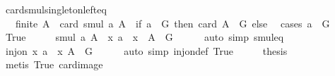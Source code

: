 \begin{isabellebody}
\endisatagproof
{\isafoldproof}%
%
\isadelimproof
\isanewline
%
\endisadelimproof
\isanewline
{}\isamarkupfalse%
\ card{\isacharunderscore}{\kern0pt}smul{\isacharunderscore}{\kern0pt}singleton{\isacharunderscore}{\kern0pt}left{\isacharunderscore}{\kern0pt}eq{\isacharcolon}{\kern0pt}\isanewline
\ \ \ {\isachardoublequoteopen}finite\ A{\isachardoublequoteclose}\ \ {\isachardoublequoteopen}card\ {\isacharparenleft}{\kern0pt}smul\ {\isacharbraceleft}{\kern0pt}a{\isacharbraceright}{\kern0pt}\ A{\isacharparenright}{\kern0pt}\ {\isacharequal}{\kern0pt}\ {\isacharparenleft}{\kern0pt}if\ a\ {\isasymin}\ G\ then\ card\ {\isacharparenleft}{\kern0pt}A\ {\isasyminter}\ G{\isacharparenright}{\kern0pt}\ else\ {}{\isacharparenright}{\kern0pt}{\isachardoublequoteclose}\isanewline
%
\isadelimproof
%
\endisadelimproof
%
\isatagproof
{}\isamarkupfalse%
\ {\isacharparenleft}{\kern0pt}cases\ {\isachardoublequoteopen}a\ {\isasymin}\ G{\isachardoublequoteclose}{\isacharparenright}{\kern0pt}\isanewline
\ \ \isamarkupfalse%
\ True\isanewline
\ \ \isamarkupfalse%
\ \isamarkupfalse%
\ {\isachardoublequoteopen}smul\ {\isacharbraceleft}{\kern0pt}a{\isacharbraceright}{\kern0pt}\ A\ {\isacharequal}{\kern0pt}\ {\isacharparenleft}{\kern0pt}{\isasymlambda}x{\isachardot}{\kern0pt}\ a\ {\isasymcdot}\ x{\isacharparenright}{\kern0pt}\ {\isacharbackquote}{\kern0pt}\ {\isacharparenleft}{\kern0pt}A\ {\isasyminter}\ G{\isacharparenright}{\kern0pt}{\isachardoublequoteclose}\isanewline
\ \ \ \ \isamarkupfalse%
\ {\isacharparenleft}{\kern0pt}auto\ simp{\isacharcolon}{\kern0pt}\ smul{\isacharunderscore}{\kern0pt}eq{\isacharparenright}{\kern0pt}\isanewline
\ \ \isamarkupfalse%
\ \isamarkupfalse%
\ {\isachardoublequoteopen}inj{\isacharunderscore}{\kern0pt}on\ {\isacharparenleft}{\kern0pt}{\isasymlambda}x{\isachardot}{\kern0pt}\ a\ {\isasymcdot}\ x{\isacharparenright}{\kern0pt}\ {\isacharparenleft}{\kern0pt}A\ {\isasyminter}\ G{\isacharparenright}{\kern0pt}{\isachardoublequoteclose}\isanewline
\ \ \ \ \isamarkupfalse%
\ {\isacharparenleft}{\kern0pt}auto\ simp{\isacharcolon}{\kern0pt}\ inj{\isacharunderscore}{\kern0pt}on{\isacharunderscore}{\kern0pt}def\ True{\isacharparenright}{\kern0pt}\isanewline
\ \ \isamarkupfalse%
\ \isamarkupfalse%
\ {\isacharquery}{\kern0pt}thesis\isanewline
\ \ \ \ \isamarkupfalse%
\ {\isacharparenleft}{\kern0pt}metis\ True\ card{\isacharunderscore}{\kern0pt}image{\isacharparenright}{\kern0pt}\isanewline

\end{isabellebody}
